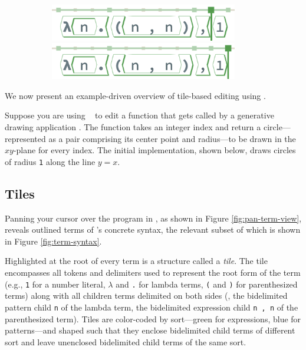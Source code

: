 \begin{figure}
\begin{subfigure}[c]{0.25\textwidth}
    \includegraphics[width=0.9\textwidth]{img/pan-tiles-9.png}
    \includegraphics[width=0.9\textwidth]{img/pan-tiles-10.png}
    \caption{}
    \label{fig:pan-tile-view}
  \end{subfigure}
\end{figure}

% 
% 

We now present an example-driven overview of tile-based
editing using \tylr.





Suppose you are using \tylr~ to edit a function that gets called by a
generative drawing application .
The function takes an integer index and
return a circle---represented as a pair comprising
its center point and radius---to be drawn in
the $xy$-plane for every index.
The initial implementation, shown below, draws circles
of radius \texttt{1} along the line $y = x$.

\subsection{Tiles}
Panning your cursor over the program in \tylr ,
as shown in Figure \ref{fig:pan-term-view},
reveals outlined terms of \tylr's concrete syntax,
the relevant subset of which is shown in
Figure \ref{fig:term-syntax}.

Highlighted at the root of every term is a structure called
a \emph{tile}.
The tile encompasses all tokens and delimiters used to represent
the root form of the term (e.g., \texttt{1} for a number literal,
$\lambda$ and \texttt{.} for lambda terms,
\texttt{(} and \texttt{)} for parenthesized terms) along with
all children terms delimited on both sides (\eg,
the bidelimited pattern child \texttt{n} of the lambda term,
the bidelimited expression child \texttt{n , n} of
the parenthesized term).
Tiles are color-coded by sort---green for expressions, blue
for patterns---and shaped such that they enclose bidelimited
child terms of different sort and leave unenclosed bidelimited
child terms of the same sort.

